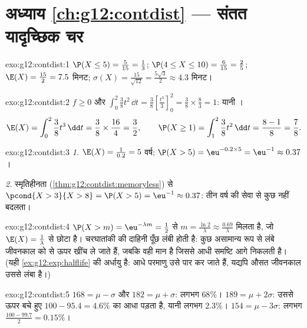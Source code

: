 \section*{अध्याय \ref{ch:g12:contdist} --- संतत यादृच्छिक चर}

\begin{solution}{exo:g12:contdist:1}
$\P(X \leq 5) = \frac{5}{15} = \frac13$; $\P(4 \leq X \leq 10) = \frac{6}{15} = \frac25$; $\E(X) = \frac{15}{2} = 7.5$ मिनट; $\sigma(X) = \frac{15}{\sqrt{12}} = \frac{5\sqrt3}{2} \approx 4.3$ मिनट।
\end{solution}

\begin{solution}{exo:g12:contdist:2}
$f \geq 0$ और $\int_0^2 \frac38 t^2\,\dd t = \frac38\left[\frac{t^3}{3}\right]_0^2
= \frac38 \times \frac83 = 1$: यानी ।
\[
\E(X) = \int_0^2 \frac38 t^3\,\dd t = \frac38 \times \frac{16}{4} = \frac32,
\qquad
\P(X \geq 1) = \int_1^2 \frac38 t^2\,\dd t = \frac{8 - 1}{8} = \frac78 .
\]
\end{solution}

\begin{solution}{exo:g12:contdist:3}
\emph{1.} $\E(X) = \frac{1}{0.2} = 5$ वर्ष; $\P(X > 5) = \eu^{-0.2\times5} = \eu^{-1} \approx 0.37$।

\emph{2.} स्मृतिहीनता (\cref{thm:g12:contdist:memoryless}) से $\pcond{X > 3}{X > 8} = \P(X > 5) = \eu^{-1} \approx 0.37$: तीन वर्ष की सेवा से कुछ नहीं बदलता।
\end{solution}

\begin{solution}{exo:g12:contdist:4}
$\P(X > m) = \eu^{-\lambda m} = \frac12$ से $m = \frac{\ln 2}{\lambda} \approx \frac{0.69}{\lambda}$ मिलता है, जो $\E(X) = \frac1\lambda$ से छोटा है। चरघातांकी  की दाहिनी पूँछ लंबी
होती है: कुछ असामान्य रूप से लंबे जीवनकाल \emph{} को \emph{} से
ऊपर खींच ले जाते हैं, जबकि  वही मान है जिससे आधी समष्टि आगे निकलती है।
(यही \cref{ex:g12:exp:halflife} की अर्धायु है: आधे परमाणु उसे पार कर जाते हैं, यद्यपि औसत जीवनकाल
उससे लंबा है।)
\end{solution}

\begin{solution}{exo:g12:contdist:5}
$168 = \mu - \sigma$ और $182 = \mu + \sigma$: लगभग $68\%$। $189 = \mu + 2\sigma$: उससे ऊपर बचे हुए $100 - 95.4 = 4.6\%$ का आधा पड़ता है, यानी
लगभग $2.3\%$। $154 = \mu - 3\sigma$: लगभग $\frac{100 - 99.7}{2} = 0.15\%$।
\end{solution}


